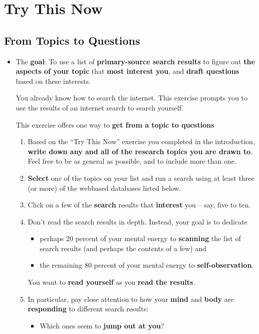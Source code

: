\documentclass[11pt]{article}
\begin{document}
\newpage
\section{Try This Now}
\subsection{From Topics to Questions}
\begin{itemize}
\item \begin{exercise}

The \textbf{goal}: To use a list of \textbf{primary-source search results} to figure out \textbf{the aspects of your topic} that \textbf{most interest you}, and \textbf{draft questions} based on these interests.

You already know how to search the internet. This exercise prompts you to use the results of an internet search to search yourself.

This exercise offers one way to \textbf{get from a topic to questions}
\begin{enumerate}
\item  Based on the “Try This Now” exercise you completed in the introduction, \textbf{write down any and all of the research topics you are drawn to}. Feel free to be as general as possible, and to include more than one.

\item \textbf{Select} one of the topics on your list and run a search using at least three (or more) of the webbased databases listed below. 

\item Click on a few of the \textbf{search} results that \textbf{interest} you -- say, five to ten.

\item Don’t read the search results in depth. Instead, your goal is to dedicate 
\begin{itemize}
\item  perhaps 20 percent of your mental energy to \textbf{scanning} the list of search results (and perhaps the contents of a few) and
\item the remaining 80 percent of your mental energy to \textbf{self-observation}. 
\end{itemize} You want to \textbf{read yourself} as you \textbf{read the results}.

\item In particular, pay close attention to how your \textbf{mind} and \textbf{body} are \textbf{responding} to different search results:
\begin{itemize}
\item Which ones seem to \textbf{jump out at you}? 


\end{itemize}
\end{enumerate}
\end{exercise}
\end{itemize}
\end{document}
